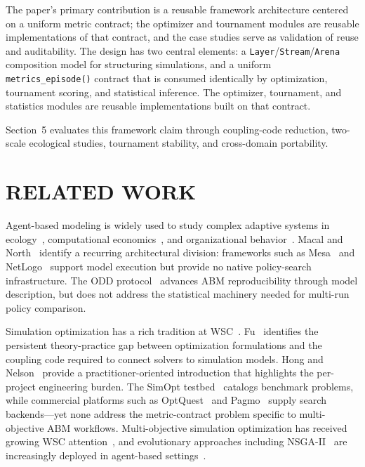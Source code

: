 \documentclass{wscpaperproc}
\begin{document}
The paper's primary contribution is a reusable framework architecture centered
on a uniform metric contract; the optimizer and tournament modules are reusable
implementations of that contract, and the case studies serve as validation of
reuse and auditability. The design has two central elements: a
\texttt{Layer}/\texttt{Stream}/\texttt{Arena} composition model for structuring
simulations, and a uniform \texttt{metrics\_episode()} contract that is
consumed identically by optimization, tournament scoring, and statistical
inference. The optimizer, tournament, and statistics modules are reusable
implementations built on that contract.

Section~5 evaluates this framework claim through coupling-code reduction,
two-scale ecological studies, tournament stability, and cross-domain
portability.

\section{RELATED WORK}

Agent-based modeling is widely used to study complex adaptive systems in
ecology~\cite{grimm2006odd}, computational economics~\cite{tesfatsion2006ace},
and organizational behavior~\cite{bonabeau2002abm}. Macal and
North~\cite{macal2010tutorial} identify a recurring architectural division:
frameworks such as Mesa~\cite{kazil2020mesa} and NetLogo~\cite{wilensky1999netlogo}
support model execution but provide no native policy-search infrastructure. The
ODD protocol~\cite{grimm2006odd} advances ABM reproducibility through model
description, but does not address the statistical machinery needed for multi-run
policy comparison.

Simulation optimization has a rich tradition at WSC~\cite{fu2002optimization,hong2009brief}.
Fu~\cite{fu2002optimization} identifies the persistent theory-practice gap between
optimization formulations and the coupling code required to connect solvers to
simulation models. Hong and Nelson~\cite{hong2009brief} provide a practitioner-oriented
introduction that highlights the per-project engineering burden. The SimOpt
testbed~\cite{pasupathy2011simopt} catalogs benchmark problems, while commercial
platforms such as OptQuest~\cite{optquest2007} and Pagmo~\cite{biscani2020pagmo}
supply search backends---yet none address the metric-contract problem specific to
multi-objective ABM workflows. Multi-objective simulation optimization has
received growing WSC attention~\cite{hunter2022multiobjective}, and evolutionary
approaches including NSGA-II~\cite{deb2002nsga2} are increasingly deployed in
agent-based settings~\cite{capri2023transport}.
\end{document}
